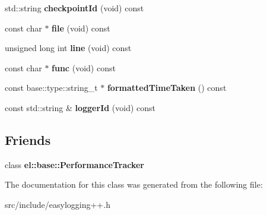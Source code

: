 \begin{DoxyCompactItemize}
\item 
\mbox{\label{classel_1_1_performance_tracking_data_ac0d48fe6a4fc03e91db90262e6526e3a}} 
std\+::string {\bfseries checkpoint\+Id} (void) const
\item 
\mbox{\label{classel_1_1_performance_tracking_data_a94fecdf5a5340a026465c8de2ff174d6}} 
const char $\ast$ {\bfseries file} (void) const
\item 
\mbox{\label{classel_1_1_performance_tracking_data_a6ac0bca1a595a60f70a2af3aaf668bf0}} 
unsigned long int {\bfseries line} (void) const
\item 
\mbox{\label{classel_1_1_performance_tracking_data_a4e0c9b070a2f1200eb1bb6f39567dafb}} 
const char $\ast$ {\bfseries func} (void) const
\item 
\mbox{\label{classel_1_1_performance_tracking_data_ae347f949eb94e2bbc3ca634ce548fdaa}} 
const base\+::type\+::string\+\_\+t $\ast$ {\bfseries formatted\+Time\+Taken} () const
\item 
\mbox{\label{classel_1_1_performance_tracking_data_a05c8ae513931c7563521b2973409ff54}} 
const std\+::string \& {\bfseries logger\+Id} (void) const
\end{DoxyCompactItemize}
\subsection*{Friends}
\begin{DoxyCompactItemize}
\item 
\mbox{\label{classel_1_1_performance_tracking_data_a6a4d7851e1984800be3c230f06a79528}} 
class {\bfseries el\+::base\+::\+Performance\+Tracker}
\end{DoxyCompactItemize}


The documentation for this class was generated from the following file\+:\begin{DoxyCompactItemize}
\item 
src/include/easylogging++.\+h\end{DoxyCompactItemize}
